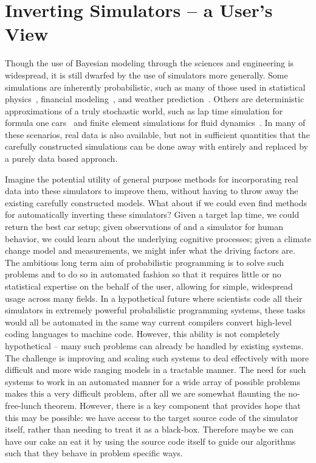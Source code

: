 
\section{Inverting Simulators -- a User's View}
\label{sec:probprog:inv}

Though the use of Bayesian modeling through the sciences and engineering is widespread,
it is still dwarfed by the use of simulators more generally.  Some simulations are inherently
probabilistic, such as many of those used in statistical physics~\citep{landau2014guide},
 financial modeling~\citep{jackel2002monte}, and weather prediction~\cite{evensen1994sequential}.  
 Others are deterministic approximations
of a truly stochastic world, such as lap time simulation for formula one cars~\citep{perantoni2014optimal}
and finite element simulations for fluid dynamics~\citep{versteeg2007introduction}.
In many of these scenarios, real data is also available, but not in sufficient quantities that the carefully
constructed simulations can be done away with entirely and replaced by a purely data based
approach.  

Imagine the potential utility of general purpose methods for incorporating real data
into these simulators to improve them, without having to throw away the existing carefully constructed models.  
What about if we could even find methods for automatically
inverting these simulators?  Given a target lap time, we could return the best car setup; given observations
of and a simulator for human behavior, we could learn about the underlying cognitive processes; given
a climate change model and measurements, we might infer what the driving factors are.  The ambitious long
term aim of probabilistic programming is to solve such problems and to do so in automated fashion
so that it requires little or no statistical expertise on the behalf of the user, allowing for simple, widespread usage
across many fields.  
In a hypothetical future where scientists
code all their simulators in extremely powerful probabilistic programming systems, these tasks would
all be automated in the same way current compilers convert high-level coding languages to machine code.  
However, this ability is not completely
hypothetical -- many such problems can already be handled by existing systems.  The challenge
is improving and scaling such systems to deal effectively with more difficult and more wide ranging models
in a tractable manner.  The need for such systems to work in an automated manner for a wide array
of possible problems makes this a very difficult problem, after all we are somewhat flaunting the no-free-lunch
theorem.  However, there is a key component that provides hope that this may be possible: we have access
to the target source code of the simulator itself, rather than needing to treat it as a black-box.  Therefore
maybe we can have our cake an eat it by using the source code itself to guide our algorithms such that
they behave in problem specific ways.  
